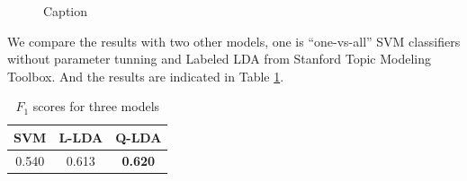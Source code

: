 \begin{figure}
\centering
{}
\qquad
{}
\qquad
{}
\qquad
\caption{\label{fig:s}Caption}
\end{figure}

We compare the results with two other models, one is ``one-vs-all'' SVM classifiers without parameter tunning and Labeled LDA from Stanford Topic Modeling Toolbox. And the results are indicated in Table \ref{table:f1}.

\begin{table}[ht] 
\caption{$F_1$ scores for three models} %
\centering %
{\small
    \begin{tabular}{c c c} 
    \hline
    SVM & L-LDA & \textbf{Q-LDA} \\ [0.5ex] %
    \hline %
    0.540 & 0.613 & \textbf{0.620}\\ %
    \hline
    \end{tabular} 
}   
\label{table:f1} %
\end{table}

